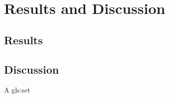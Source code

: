 \chapter{Results and Discussion}
\label{ch:Results and Discussion}

\section{Results}

\section{Discussion}

  A \gls{gls:set} 